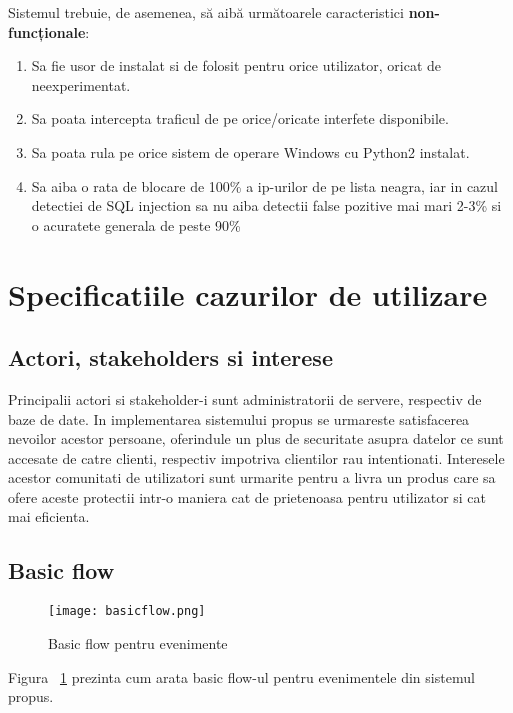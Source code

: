Sistemul trebuie, de asemenea, să aibă următoarele caracteristici \textbf{non-funcționale}:
\begin{enumerate}
	\item Sa fie usor de instalat si de folosit pentru orice utilizator, oricat de neexperimentat.
	\item Sa poata intercepta traficul de pe orice/oricate interfete disponibile.
	\item Sa poata rula pe orice sistem de operare Windows cu Python2 instalat.
	\item Sa aiba o rata de blocare de 100\% a ip-urilor de pe lista neagra, iar
	in cazul detectiei de SQL injection sa nu aiba detectii false pozitive mai mari 2-3\%
	si o acuratete generala de peste 90\%
\end{enumerate}
\newpage

\section{Specificatiile cazurilor de utilizare}

\subsection{Actori, stakeholders si interese}

Principalii actori si stakeholder-i sunt administratorii de servere, respectiv de baze de date. In implementarea sistemului propus se urmareste satisfacerea nevoilor acestor persoane, oferindule un plus de securitate asupra datelor ce sunt accesate de catre clienti, respectiv impotriva clientilor rau intentionati. Interesele acestor comunitati de utilizatori sunt urmarite pentru a livra un produs care sa ofere aceste protectii intr-o maniera cat de prietenoasa pentru utilizator si cat mai eficienta.

\subsection{Basic flow}

\begin{figure}[h]
	\centering
	\texttt{[image: basicflow.png]}
	\caption{Basic flow pentru evenimente}
	\label{fig:basic-flow}
\end{figure}
Figura ~\ref{fig:basic-flow} prezinta cum arata basic flow-ul pentru evenimentele din sistemul propus. \\

